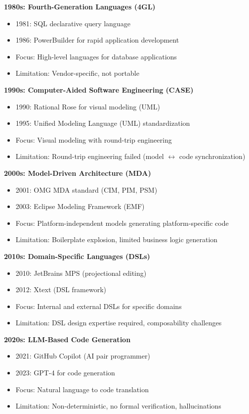 \textbf{1980s: Fourth-Generation Languages (4GL)}
\begin{itemize}
    \item 1981: SQL declarative query language
    \item 1986: PowerBuilder for rapid application development
    \item Focus: High-level languages for database applications
    \item Limitation: Vendor-specific, not portable
\end{itemize}

\textbf{1990s: Computer-Aided Software Engineering (CASE)}
\begin{itemize}
    \item 1990: Rational Rose for visual modeling (UML)
    \item 1995: Unified Modeling Language (UML) standardization
    \item Focus: Visual modeling with round-trip engineering
    \item Limitation: Round-trip engineering failed (model $\leftrightarrow$ code synchronization)
\end{itemize}

\textbf{2000s: Model-Driven Architecture (MDA)}
\begin{itemize}
    \item 2001: OMG MDA standard (CIM, PIM, PSM)
    \item 2003: Eclipse Modeling Framework (EMF)
    \item Focus: Platform-independent models generating platform-specific code
    \item Limitation: Boilerplate explosion, limited business logic generation
\end{itemize}

\textbf{2010s: Domain-Specific Languages (DSLs)}
\begin{itemize}
    \item 2010: JetBrains MPS (projectional editing)
    \item 2012: Xtext (DSL framework)
    \item Focus: Internal and external DSLs for specific domains
    \item Limitation: DSL design expertise required, composability challenges
\end{itemize}

\textbf{2020s: LLM-Based Code Generation}
\begin{itemize}
    \item 2021: GitHub Copilot (AI pair programmer)
    \item 2023: GPT-4 for code generation
    \item Focus: Natural language to code translation
    \item Limitation: Non-deterministic, no formal verification, hallucinations
\end{itemize}

